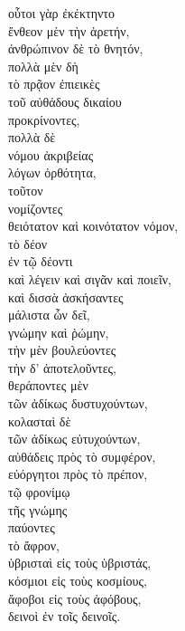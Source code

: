 {\large
\begin{greek}
\noindent οὗτοι γὰρ ἐκέκτηντο \\
ἔνθεον μὲν τὴν ἀρετήν, \\
ἀνθρώπινον δὲ τὸ θνητόν, \\
πολλὰ μὲν δὴ \\
\tabto{2em} τὸ πρᾷον ἐπιεικὲς \\
\tabto{2em} τοῦ αὐθάδους δικαίου \\
\tabto{4em} προκρίνοντες, \\
πολλὰ δὲ \\
\tabto{2em} νόμου ἀκριβείας \\
\tabto{2em} λόγων ὀρθότητα, \\
τοῦτον\\
\tabto{2em} νομίζοντες \\
θειότατον καὶ κοινότατον νόμον, \\
\tabto{4em} τὸ δέον \\
\tabto{4em} ἐν τῷ δέοντι \\
\tabto{4em} καὶ λέγειν καὶ σιγᾶν καὶ ποιεῖν, \\
καὶ δισσὰ ἀσκήσαντες \\
\tabto{2em} μάλιστα ὧν δεῖ, \\
\tabto{4em} γνώμην καὶ ῥώμην, \\
\tabto{6em} τὴν μὲν βουλεύοντες \\
\tabto{6em} τὴν δ' ἀποτελοῦντες, \\
θεράποντες μὲν \\
\tabto{2em} τῶν ἀδίκως δυστυχούντων, \\
κολασταὶ δὲ \\
\tabto{2em} τῶν ἀδίκως εὐτυχούντων, \\
αὐθάδεις πρὸς τὸ συμφέρον, \\
εὐόργητοι πρὸς τὸ πρέπον, \\
\tabto{2em} τῷ φρονίμῳ \\
\tabto{4em} τῆς γνώμης \\
παύοντες \\
\tabto{2em} τὸ ἄφρον, \\
ὑβρισταὶ εἰς τοὺς ὑβριστάς, \\
κόσμιοι εἰς τοὺς κοσμίους, \\
ἄφοβοι εἰς τοὺς ἀφόβους, \\
δεινοὶ ἐν τοῖς δεινοῖς. \\

\end{greek}
}

